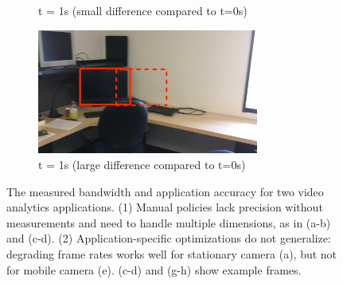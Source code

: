 \begin{figure}
\begin{subfigure}{0.5\textwidth}
    \caption{t = 1s (small difference compared to t=0s)}
  \end{subfigure}%
  \begin{subfigure}{0.5\textwidth}
    \centering
    \includegraphics[width=0.8\textwidth]{figures/darknet-2.jpg}
    \caption{t = 1s (large difference compared to t=0s)}
  \end{subfigure}

  \caption{The measured bandwidth and application accuracy for two video
    analytics applications. (1) Manual policies lack precision without
    measurements and need to handle multiple dimensions, as in (a-b) and
    (c-d). (2) Application-specific optimizations do not generalize: degrading
    frame rates works well for stationary camera (a), but not for mobile camera
    (e). (c-d) and (g-h) show example frames.}
  \label{fig:app-specific}
\end{figure}

